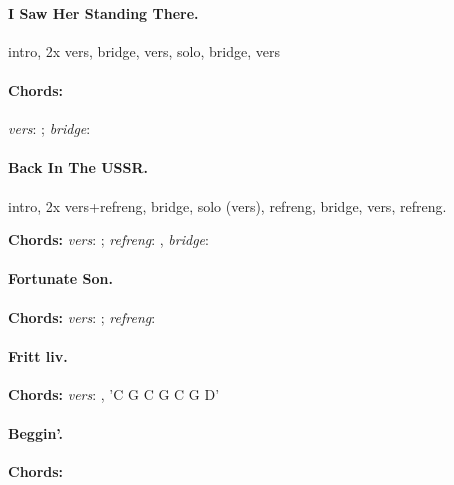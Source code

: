 \documentclass[%
twoside,                 %
draft,                   %
final,                   %
10pt]{article}
\begin{document}
\paragraph{I Saw Her Standing There.}
intro, 2x vers, bridge, vers, solo, bridge, vers

\paragraph{Chords:}
\emph{vers}: ; \emph{bridge}: 










\paragraph{Back In The USSR.}
intro, 2x vers+refreng, bridge, solo (vers), refreng, bridge, vers, refreng.

\textbf{Chords:} \emph{vers}: ; \emph{refreng}: ,
\emph{bridge}: 





\paragraph{Fortunate Son.}

\textbf{Chords:} \emph{vers}: ; \emph{refreng}: 





\paragraph{Fritt liv.}

\textbf{Chords:} \emph{vers}: , 'C G C G C G D'




\paragraph{Beggin'.}
\textbf{Chords:} 
\end{document}

